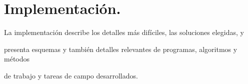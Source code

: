 \newpage\mbox{}\thispagestyle{empty}

\chapter{Implementación.}

La implementación describe los detalles más difíciles, las soluciones elegidas, y 

presenta esquemas y también detalles relevantes de programas, algoritmos y métodos 

de trabajo y tareas de campo desarrollados.